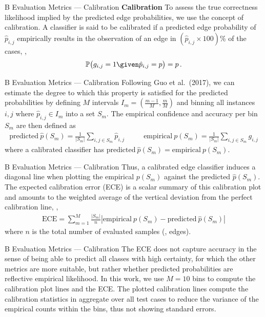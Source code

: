 \documentclass[aspectratio=169,10pt]{beamer}
\begin{document}
\begin{frame}{B Evaluation Metrics --- Calibration}
\textbf{Calibration}\quad
To assess the true correctness likelihood implied by the predicted edge probabilities, we use the concept of calibration. A classifier is said to be calibrated if a predicted edge probability of $\hat{p}_{i,j}$ empirically results in the observation of an edge in $(\hat{p}_{i,j} \times 100)$\% of the cases, \ie,
\begin{align*}
    \mathbb{P}\big(g_{i,j} = 1 \given \hat{p}_{i,j} = p\big) = p \, .
\end{align*}
\end{frame}

\begin{frame}{B Evaluation Metrics --- Calibration}
\small
Following Guo et al.\ (2017), we can estimate the degree to which this property is satisfied for the predicted probabilities by defining $M$ intervals $I_m = (\tfrac{m-1}{M}, \tfrac{m}{M})$ and binning all instances $i,j$ where $\hat{p}_{i,j} \in I_m$ into a set $S_m$. The empirical confidence and accuracy per bin $S_m$ are then defined as
\begin{align*}
    \text{predicted}~\hat{p}(S_m) = \frac{1}{|S_m|} \sum_{{i,j} \in S_m} \hat{p}_{i,j}~~~~~~~~~~~~
    \text{empirical}~p(S_m) = \frac{1}{|S_m|} \sum_{{i,j} \in S_m} g_{i,j}
\end{align*}
where a calibrated classifier has $\text{predicted}~\hat{p}(S_m) = \text{empirical}~p(S_m)$.
\end{frame}

\begin{frame}{B Evaluation Metrics --- Calibration}
Thus, a calibrated edge classifier induces a diagonal line when plotting the empirical $p(S_m)$ against the predicted $\hat{p}(S_m)$. The expected calibration error (ECE) is a scalar summary of this calibration plot and amounts to the weighted average of the vertical deviation from the perfect calibration line, \ie,
\begin{align*}
    \text{ECE} = \sum_{m=1}^M \frac{|S_m|}{n} \left |\text{empirical}~p(S_m) - \text{predicted}~\hat{p}(S_m) \right |
\end{align*}
where $n$ is the total number of evaluated samples (\ie, edges).
\end{frame}

\begin{frame}{B Evaluation Metrics --- Calibration}
The ECE does not capture accuracy in the sense of being able to predict all classes with high certainty, for which the other metrics are more suitable, but rather whether predicted probabilities are reflective empirical likelihood. In this work, we use $M=10$ bins to compute the calibration plot lines and the ECE. The plotted calibration lines compute the calibration statistics in aggregate over all test cases to reduce the variance of the empirical counts within the bins, thus not showing standard errors.
\end{frame}
\end{document}
